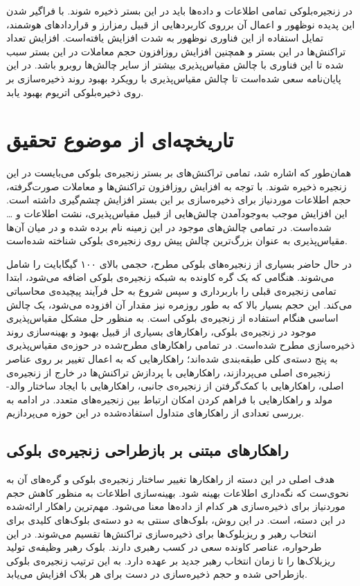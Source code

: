 در زنجیره‌بلوکی تمامی اطلاعات و داده‌ها باید در این بستر ذخیره شوند. با فراگیر شدن این پدیده نوظهور و اعمال آن برروی کاربردهایی از قبیل رمزارز و قراردادهای هوشمند، تمایل استفاده از این فناوری نوظهور به شدت افزایش یافته‌است. افزایش تعداد تراکنش‌ها در این بستر و همچنین افزایش روزافزون حجم معاملات در این بستر سبب شده تا این فناوری با چالش مقیاس‌پذیری بیشتر از سایر چالش‌ها روبرو باشد. در این پایان‌نامه سعی شده‌است تا چالش مقیاس‌پذیری با رویکرد بهبود روند ذخیره‌سازی بر روی ذخیره‌بلوکی اتریوم بهبود یابد.

\section{تاریخچه‌ای از موضوع تحقیق}
همان‌‌طور که اشاره شد، تمامی تراکنش‌های بر بستر زنجیره‌ی بلوکی می‌بایست در این زنجیره ذخیره شوند. با توجه به افزایش روزافزون تراکنش‌ها و معاملات صورت‌گرفته، حجم اطلاعات موردنیاز برای ذخیره‌سازی بر این بستر افزایش چشم‌گیری داشته است. این افزایش موجب به‌وجود‌آمدن چالش‌هایی از قبیل مقیاس‌پذیری، نشت اطلاعات و \dots شده‌است. در \cite{Lin2017}
تمامی چالش‌های موجود در این زمینه نام برده شده و در میان آن‌ها مقیاس‌پذیری به عنوان بزرگ‌ترین چالش پیش‌ روی زنجیر‌ه‌ی بلوکی شناخته شده‌است. 

در حال حاضر بسیاری از زنجیره‌های بلوکی مطرح، حجمی بالای ۱۰۰ گیگابایت را شامل می‌شوند. هنگامی که یک گره کاونده به شبکه زنجیره‌ی بلوکی اضافه می‌شود، ابتدا تمامی زنجیره‌ی قبلی را باربرداری و سپس شروع به حل فرآیند پیچیده‌ی محاسباتی می‌کند. این حجم بسیار بالا که به طور روزمره نیز مقدار آن افزوده می‌شود، یک چالش اساسی هنگام استفاده از زنجیره‌ی بلوکی است. \cite{Wang2018}
به منظور حل مشکل مقیاس‌پذیری موجود در زنجیره‌ی بلوکی، راهکارهای بسیاری از قبیل بهبود و بهینه‌سازی روند ذخیره‌سازی مطرح شده‌است.
در \cite{Kim2018} تمامی راهکارهای مطرح‌شده در حوزه‌ی مقیاس‌پذیری به پنج دسته‌ی کلی طبقه‌بندی شده‌اند؛ راهکارهایی که به اعمال تغییر بر روی عناصر زنجیره‌ی اصلی می‌پردازند، راهکارهایی با پردازش تراکنش‌ها در خارج از زنجیره‌ی اصلی، راهکارهایی با کمک‌گرفتن از زنجیره‌ی جانبی، راهکارهایی با ایجاد ساختار والد-مولد و راهکارهایی با فراهم کردن امکان ارتباط بین زنجیره‌های متعدد.
در ادامه به بررسی تعدادی از راهکارهای متداول استفاده‌شده در این حوزه می‌پردازیم.

\subsection{راهکارهای مبتنی بر بازطراحی زنجیره‌ی بلوکی}
هدف اصلی در این دسته از راهکارها تغییر ساختار زنجیره‌ی بلوکی و گره‌های آن به نحوی‌ست که نگه‌داری اطلاعات بهینه شود. بهینه‌سازی اطلاعات به منظور کاهش حجم موردنیاز برای ذخیره‌سازی هر کدام از داده‌ها معنا می‌شود. مهم‌ترین راهکار ارائه‌شده در این دسته، \cite{Eyal2015} است. در این روش، بلوک‌های سنتی به دو دسته‌ی بلوک‌های کلیدی برای انتخاب رهبر و ریزبلوک‌ها برای ذخیره‌سازی تراکنش‌ها تقسیم می‌شوند. در این طرحواره، عناصر کاونده سعی در کسب رهبری دارند. بلوک رهبر وظیفه‌ی تولید ریزبلاک‌ها را تا زمان انتخاب رهبر جدید بر عهده دارد. به این ترتیب زنجیره‌ی بلوکی بازطراحی شده و حجم ذخیره‌سازی در دست برای هر بلاک افزایش می‌یابد. 

